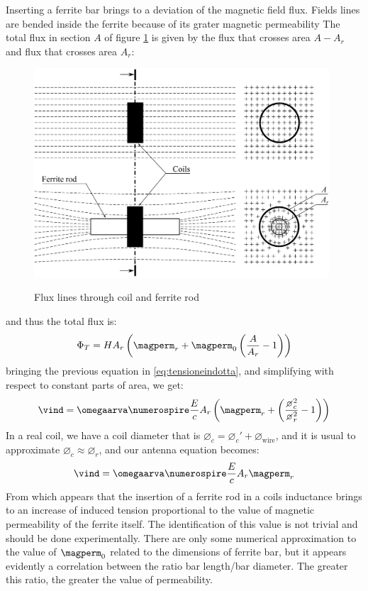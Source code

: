 Inserting a ferrite bar brings to a deviation of the magnetic field flux. Fields lines are bended inside the ferrite because of its grater magnetic permeability
The total flux in section $A$ of figure \ref{fig:flussoferrite} is given by the flux that crosses area ${A-A_r}$ and flux that crosses area $A_r$:
\begin{figure}
	\centering
	\includegraphics[width=11cm]{ch2/img/flux_lines.pdf}
	\label{fig:flussoferrite}
	\caption{Flux lines through coil and ferrite rod}
	\forceversofloat
\end{figure}
and thus the total flux is:
\begin{equation}
\Phi_T = H A_r \braces{ \magperm_r + \magperm_0 \braces{ \dfrac{A}{A_r} - 1} }
\end{equation}
bringing the previous equation in \ref{eq:tensioneindotta}, and simplifying with respect to constant parts of area, we get:
\begin{equation}
\vind = \omegaarva \numerospire \dfrac{E}{c} A_r \braces{\magperm_r + \braces{\dfrac{\diameter_c^2}{\diameter_r^2}-1}}
\end{equation}
In a real coil, we have a coil diameter that is ${\diameter_c = \diameter_c' + \diameter_\mathrm{wire}}$, and it is usual to approximate ${\diameter_c \approx \diameter_r}$, and our antenna equation becomes:
\begin{equation}
\vind = \omegaarva \numerospire \dfrac{E}{c} A_r \magperm_r
\end{equation}
From which appears that the insertion of a ferrite rod in a coils inductance brings to an increase of induced tension proportional to the value of magnetic permeability of the ferrite itself. The identification of this value is not trivial and should be done experimentally. There are only some numerical approximation to the value of $\magperm_0$ related to the dimensions of ferrite bar, but it appears evidently a correlation between the ratio bar length/bar diameter. The greater this ratio, the greater the value of permeability. 
